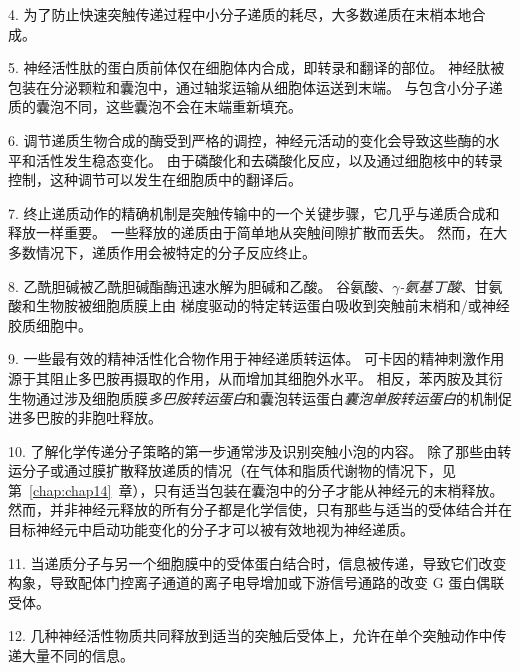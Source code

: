 4. 为了防止快速突触传递过程中小分子递质的耗尽，大多数递质在末梢本地合成。


5. 神经活性肽的蛋白质前体仅在细胞体内合成，即转录和翻译的部位。
神经肽被包装在分泌颗粒和囊泡中，通过轴浆运输从细胞体运送到末端。
与包含小分子递质的囊泡不同，这些囊泡不会在末端重新填充。 


6. 调节递质生物合成的酶受到严格的调控，神经元活动的变化会导致这些酶的水平和活性发生稳态变化。
由于磷酸化和去磷酸化反应，以及通过细胞核中的转录控制，这种调节可以发生在细胞质中的翻译后。 


7. 终止递质动作的精确机制是突触传输中的一个关键步骤，它几乎与递质合成和释放一样重要。
一些释放的递质由于简单地从突触间隙扩散而丢失。
然而，在大多数情况下，递质作用会被特定的分子反应终止。 


8. 乙酰胆碱被乙酰胆碱酯酶迅速水解为胆碱和乙酸。
谷氨酸、\textit{$\gamma$-氨基丁酸}、甘氨酸和生物胺被细胞质膜上由  梯度驱动的特定转运蛋白吸收到突触前末梢和/或神经胶质细胞中。


9. 一些最有效的精神活性化合物作用于神经递质转运体。
可卡因的精神刺激作用源于其阻止多巴胺再摄取的作用，从而增加其细胞外水平。
相反，苯丙胺及其衍生物通过涉及细胞质膜\textit{多巴胺转运蛋白}和囊泡转运蛋白\textit{囊泡单胺转运蛋白}的机制促进多巴胺的非胞吐释放。


10. 了解化学传递分子策略的第一步通常涉及识别突触小泡的内容。
除了那些由转运分子或通过膜扩散释放递质的情况（在气体和脂质代谢物的情况下，见第~\ref{chap:chap14}~章），只有适当包装在囊泡中的分子才能从神经元的末梢释放。
然而，并非神经元释放的所有分子都是化学信使，只有那些与适当的受体结合并在目标神经元中启动功能变化的分子才可以被有效地视为神经递质。 


11. 当递质分子与另一个细胞膜中的受体蛋白结合时，信息被传递，导致它们改变构象，导致配体门控离子通道的离子电导增加或下游信号通路的改变 G 蛋白偶联受体。 


12. 几种神经活性物质共同释放到适当的突触后受体上，允许在单个突触动作中传递大量不同的信息。


